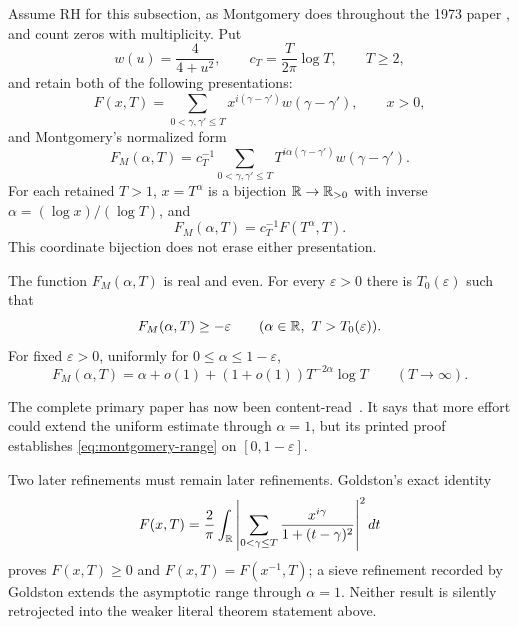 Assume RH for this subsection, as Montgomery does throughout the 1973 paper
\cite[pp.~181--192]{montgomery1973}, and count
zeros with multiplicity.  Put
\begin{equation}
 w(u)=\frac4{4+u^2},
 \qquad
 c_T=\frac{T}{2\pi}\log T,
 \qquad T\geq2,
 \label{eq:montgomery-weight-normalization}
\end{equation}
and retain both of the following presentations:
\begin{equation}
 F(x,T)=\sum_{0<\gamma,\gamma'\leq T}
 x^{i(\gamma-\gamma')}w(\gamma-\gamma'),
 \qquad x>0,
 \label{eq:F-xT}
\end{equation}
and Montgomery's normalized form
\begin{equation}
 F_M(\alpha,T)=c_T^{-1}
 \sum_{0<\gamma,\gamma'\leq T}
 T^{i\alpha(\gamma-\gamma')}w(\gamma-\gamma').
 \label{eq:F-alphaT}
\end{equation}
For each retained $T>1$, $x=T^\alpha$ is a bijection
$\mathbb R\to\mathbb R_{>0}$ with inverse $\alpha=(\log x)/(\log T)$, and
\[
 F_M(\alpha,T)=c_T^{-1}F(T^\alpha,T).
\]
This coordinate bijection does not erase either presentation.

\begin{theorem}
\cite[pp.~181 and~187--191, eqs.~(2) and~(18)--(34)]{montgomery1973}
The function $F_M(\alpha,T)$ is real and even.  For every $\varepsilon>0$ there is
$T_0(\varepsilon)$ such that
\[
 F_M(\alpha,T)\geq-\varepsilon
 \qquad(\alpha\in\mathbb R,\ T>T_0(\varepsilon)).
\]
For fixed $\varepsilon>0$, uniformly for $0\leq\alpha\leq1-\varepsilon$,
\begin{equation}
 F_M(\alpha,T)=\alpha+o(1)+(1+o(1))T^{-2\alpha}\log T
 \qquad(T\to\infty).
 \label{eq:montgomery-range}
\end{equation}
\end{theorem}

The complete primary paper has now been content-read~\cite{montgomery1973}.  It says that
more effort could extend the uniform estimate through
$\alpha=1$, but its printed proof establishes \eqref{eq:montgomery-range} on
$[0,1-\varepsilon]$.

Two later refinements must remain later refinements.  Goldston's exact identity
\cite[eqs.~(4.1)--(4.11)]{goldston2004}
\begin{equation}
 F(x,T)=\frac2\pi\int_\mathbb R
 \left|\sum_{0<\gamma\leq T}
 \frac{x^{i\gamma}}{1+(t-\gamma)^2}\right|^2dt
 \label{eq:goldston-positive-square}
\end{equation}
proves $F(x,T)\geq0$ and $F(x,T)=F(x^{-1},T)$; a sieve refinement recorded by
Goldston extends the asymptotic range through $\alpha=1$.  Neither result is silently
retrojected into the weaker literal theorem statement above.

